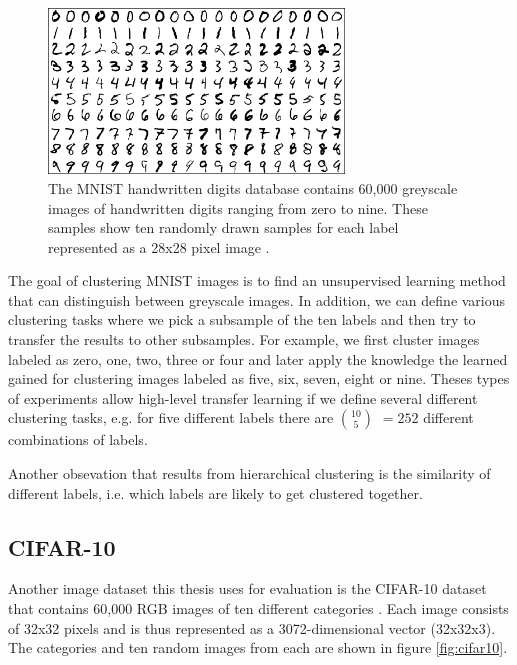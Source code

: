 \begin{figure}[h]
    \centering
    \includegraphics[width=0.7\textwidth]{images/mnist}
    \caption{The MNIST handwritten digits database contains 60,000 greyscale images of handwritten digits ranging from zero to nine. These samples show ten randomly drawn samples for each label represented as a 28x28 pixel image \cite{lecun-mnisthandwrittendigit-2010}.}
    \label{fig:mnist}
\end{figure}

The goal of clustering MNIST images is to find an unsupervised learning method that can distinguish between greyscale images. In addition, we can define various clustering tasks where we pick a subsample of the ten labels and then try to transfer the results to other subsamples. For example, we first cluster images labeled as zero, one, two, three or four and later apply the knowledge the learned gained for clustering images labeled as five, six, seven, eight or nine. Theses types of experiments allow high-level transfer learning if we define several different clustering tasks, e.g. for five different labels there are $10 \choose 5$ $= 252$ different combinations of labels.

Another obsevation that results from hierarchical clustering is the similarity of different labels, i.e. which labels are likely to get clustered together.

\subsection{CIFAR-10}

Another image dataset this thesis uses for evaluation is the CIFAR-10 dataset that contains 60,000 RGB images of ten different categories \cite{Krizhevsky2009LearningML}. Each image consists of 32x32 pixels and is thus represented as a 3072-dimensional vector (32x32x3). The categories and ten random images from each are shown in figure \ref{fig:cifar10}.

